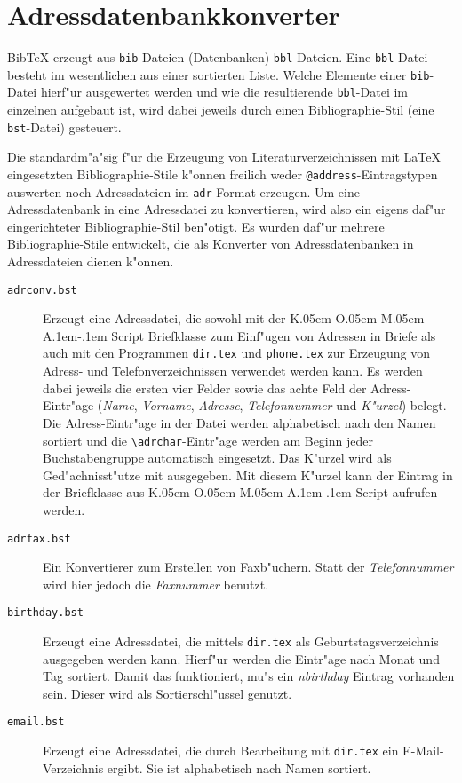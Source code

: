 \documentclass{article}
\newcommand*{\File}[1]{\texttt{#1}}
\newcommand*{\Macro}[1]{\texttt{\textbackslash #1}}
\DeclareRobustCommand{\KOMAScript}{\textsf{K\kern.05em O\kern.05em%
      M\kern.05em A\kern.1em-\kern.1em Script}}
\begin{document}
\section{Adressdatenbankkonverter}%

Bib\TeX{} erzeugt aus \File{bib}-Dateien (Datenbanken) \File{bbl}-Dateien.
Eine \File{bbl}-Datei besteht im wesentlichen aus einer sortierten Liste.
Welche Elemente einer \File{bib}-Datei hierf"ur ausgewertet werden und wie
die resultierende \File{bbl}-Datei im einzelnen aufgebaut ist, wird dabei
jeweils durch einen Bibliographie-Stil (eine \File{bst}-Datei) gesteuert. 

Die standardm"a"sig f"ur die Erzeugung von Literaturverzeichnissen mit
\LaTeX{} eingesetzten Bibliographie-Stile k"onnen freilich weder
\verb|@address|-Eintragstypen auswerten noch Adressdateien im
\File{adr}-Format erzeugen.  Um eine Adressdatenbank in eine Adressdatei zu
konvertieren, wird also ein eigens daf"ur eingerichteter Bibliographie-Stil
ben"otigt.  Es wurden daf"ur mehrere Bibliographie-Stile entwickelt, die als
Konverter von Adressdatenbanken in Adressdateien dienen k"onnen.

\begin{description}

	\item[\File{adrconv.bst}] Erzeugt eine Adressdatei, die sowohl mit
	der {\KOMAScript} Briefklasse zum Einf"ugen von Adressen in
	Briefe als auch mit den Programmen \File{dir.tex} und
	\File{phone.tex} zur Erzeugung von Adress- und
	Telefonverzeichnissen verwendet werden kann. Es werden dabei
	jeweils die ersten vier Felder sowie das achte Feld der
	Adress-Eintr"age (\emph{Name}, \emph{Vorname},
	\emph{Adresse}, \emph{Telefonnummer} und \emph{K"urzel})
	belegt. Die Adress-Eintr"age in der Datei werden
	alphabetisch nach den Namen sortiert und die
	\Macro{adrchar}-Eintr"age werden am Beginn jeder
	Buchstabengruppe automatisch eingesetzt. Das K"urzel wird
	als Ged"achnisst"utze mit ausgegeben. Mit diesem K"urzel
	kann der Eintrag in der Briefklasse aus {\KOMAScript}
	aufrufen werden.
	
     \item[\File{adrfax.bst}]  Ein Konvertierer zum Erstellen von
     Faxb"uchern. Statt der \emph{Telefonnummer} wird hier jedoch
     die \emph{Faxnummer} benutzt. 
     
     \item[\File{birthday.bst}] Erzeugt eine Adressdatei, die mittels
     \File{dir.tex} als Geburtstagsverzeichnis ausgegeben werden
     kann.  Hierf"ur werden die Eintr"age nach Monat und Tag
     sortiert. Damit das funktioniert, mu"s ein \emph{nbirthday}
     Eintrag vorhanden sein. Dieser wird als Sortierschl"ussel
     genutzt.

     \item[\File{email.bst}] Erzeugt eine Adressdatei, die durch Bearbeitung
     mit \File{dir.tex} ein E-Mail-Verzeichnis ergibt. Sie ist alphabetisch
     nach Namen sortiert.

\end{description}
\end{document}
